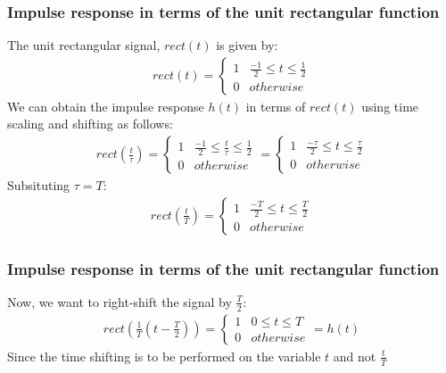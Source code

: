 \documentclass{beamer}
\providecommand{\brak}[1]{\ensuremath{\left(#1\right)}}
\begin{document}
\begin{frame}
    \frametitle {Impulse response in terms of the unit rectangular function}
    \begin{flushleft}
    The unit rectangular signal, $rect(t)$ is given by:
\begin{align}
    rect(t) = 
    \begin{cases}
    1 & \frac{-1}{2} \leq t \leq \frac{1}{2} \\
    0 & otherwise
    \end{cases}
    \label{rect}
\end{align}
We can obtain the impulse response $h(t)$ in terms of $rect(t)$ using time scaling and shifting as follows:
\begin{align}
    rect\brak{\frac{t}{\tau}} = 
    \begin{cases}
    1 & \frac{-1}{2} \leq \frac{t}{\tau} \leq  \frac{1}{2}\\
    0 & otherwise
    \end{cases}
     = 
     \begin{cases}
     1 & \frac{-\tau}{2} \leq t \leq  \frac{\tau}{2}\\
    0 & otherwise
     \end{cases}
    \end{align}
    Subsituting $\tau = T$:
    \begin{align}
    rect\brak{\frac{t}{T}} = 
    \begin{cases}
    1 & \frac{-T}{2} \leq t \leq \frac{T}{2}\\
    0 & otherwise
    \end{cases}
    \end{align}
    \end{flushleft}
\end{frame}
\begin{frame}
    \frametitle{Impulse response in terms of the unit rectangular function}
    \begin{flushleft}
      Now, we want to right-shift the signal by $\frac{T}{2}$:
    \begin{align}
    rect\brak{\frac{1}{T}\brak{t - \frac{T}{2}}} = 
    \begin{cases}
    1 &  0 \leq t \leq T\\
    0 & otherwise
    \end{cases}
     = h(t)
\end{align}
Since the time shifting is to be performed on the variable $t$ and not $\frac{t}{T}$\\
    \end{flushleft}
\end{frame}
\end{document}
